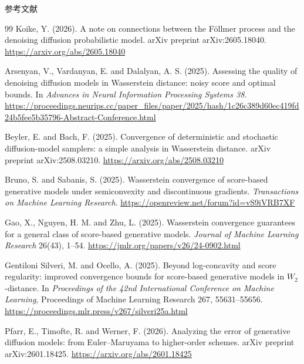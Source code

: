 \documentclass[11pt]{beamer}
\theoremstyle{plain}
\theoremstyle{definition}
\begin{document}
\begin{frame}[allowframebreaks]{参考文献}
\begin{thebibliography}{99}
    Koike, Y. (2026).
    A note on connections between the F\"ollmer process and the
    denoising diffusion probabilistic model.
    arXiv preprint arXiv:2605.18040.
    \url{https://arxiv.org/abs/2605.18040}

    Arsenyan, V., Vardanyan, E. and Dalalyan, A. S. (2025).
    Assessing the quality of denoising diffusion models in Wasserstein distance:
    noisy score and optimal bounds.
    In \textit{Advances in Neural Information Processing Systems 38}.
    \url{https://proceedings.neurips.cc/paper_files/paper/2025/hash/1c26c389d60ec419fd24b5fee5b35796-Abstract-Conference.html}
    
    Beyler, E. and Bach, F. (2025).
    Convergence of deterministic and stochastic diffusion-model samplers:
    a simple analysis in Wasserstein distance.
    arXiv preprint arXiv:2508.03210.
    \url{https://arxiv.org/abs/2508.03210}
    
    Bruno, S. and Sabanis, S. (2025).
    Wasserstein convergence of score-based generative models under
    semiconvexity and discontinuous gradients.
    \textit{Transactions on Machine Learning Research}.
    \url{https://openreview.net/forum?id=vS9iVRB7XF}
    
    Gao, X., Nguyen, H. M. and Zhu, L. (2025).
    Wasserstein convergence guarantees for a general class of
    score-based generative models.
    \textit{Journal of Machine Learning Research} 26(43), 1--54.
    \url{https://jmlr.org/papers/v26/24-0902.html}
    
    Gentiloni Silveri, M. and Ocello, A. (2025).
    Beyond log-concavity and score regularity:
    improved convergence bounds for score-based generative models
    in $W_2$-distance.
    In \textit{Proceedings of the 42nd International Conference on Machine Learning},
    Proceedings of Machine Learning Research 267, 55631--55656.
    \url{https://proceedings.mlr.press/v267/silveri25a.html}
    
    Pfarr, E., Timofte, R. and Werner, F. (2026).
    Analyzing the error of generative diffusion models:
    from Euler--Maruyama to higher-order schemes.
    arXiv preprint arXiv:2601.18425.
    \url{https://arxiv.org/abs/2601.18425}
    

\end{thebibliography}
\end{frame}
\end{document}
